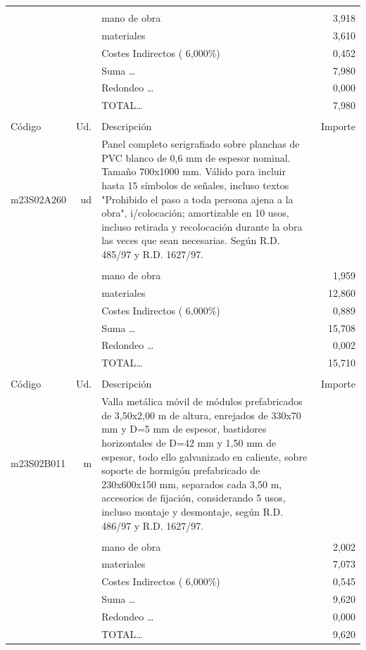 \begin{supertabular}{l r p{60mm} r}
&&&\\%
&&mano de obra&     3,918\\%
&&materiales&     3,610\\%
&&Costes Indirectos (     6,000\%)&     0,452\\%
&&Suma \ldots&     7,980\\%
&&Redondeo \ldots&     0,000\\%
%
&&TOTAL\ldots&     7,980\\%
&&&\\%
Código&Ud.&Descripción&Importe\\%
\hline%
m23S02A260&ud&Panel completo serigrafiado sobre planchas de PVC blanco de 0,6 mm de espesor nominal. Tamaño 700x1000 mm. Válido para incluir hasta 15 símbolos de señales, incluso textos "Prohibido el paso a toda persona ajena a la obra", i/colocación; amortizable en 10 usos, incluso retirada y recolocación durante la obra las veces que sean necesarias. Según R.D. 485/97 y R.D. 1627/97.&\\%
&&&\\%
&&mano de obra&     1,959\\%
&&materiales&    12,860\\%
&&Costes Indirectos (     6,000\%)&     0,889\\%
&&Suma \ldots&    15,708\\%
&&Redondeo \ldots&     0,002\\%
%
&&TOTAL\ldots&    15,710\\%
&&&\\%
Código&Ud.&Descripción&Importe\\%
\hline%
m23S02B011&m&Valla metálica móvil de módulos prefabricados de 3,50x2,00 m de altura, enrejados de 330x70 mm y D=5 mm de espesor, bastidores horizontales de D=42 mm y 1,50 mm de espesor, todo ello galvanizado en caliente, sobre soporte de hormigón prefabricado de 230x600x150 mm, separados cada 3,50 m, accesorios de fijación, considerando 5 usos, incluso montaje y desmontaje, según R.D. 486/97 y R.D. 1627/97.&\\%
&&&\\%
&&mano de obra&     2,002\\%
&&materiales&     7,073\\%
&&Costes Indirectos (     6,000\%)&     0,545\\%
&&Suma \ldots&     9,620\\%
&&Redondeo \ldots&     0,000\\%
%
&&TOTAL\ldots&     9,620\\%

\end{supertabular}

